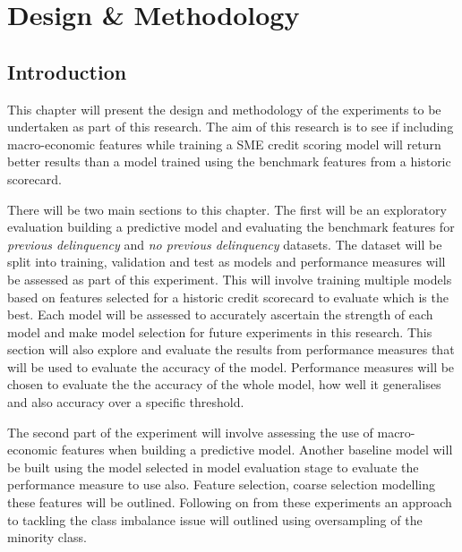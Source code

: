 
\chapter{Design \& Methodology} %

\label{Chapter4} %


\section{Introduction}

This chapter will present the design and methodology of the experiments to be undertaken as part of this research. The aim of this research is to see if including macro-economic features while training a SME credit scoring model will return better results than a model trained using the benchmark features from a historic scorecard. 

There will be two main sections to this chapter. The first will be an exploratory evaluation building a predictive model and evaluating the benchmark features for \textit{previous delinquency} and \textit{no previous delinquency} datasets. The dataset will be split into training, validation and test as models and performance measures will be assessed as part of this experiment. This will involve training multiple models based on features selected for a historic credit scorecard to evaluate which is the best. Each model will be assessed to accurately ascertain the strength of each model and make model selection for future experiments in this research. This section will also explore and evaluate the results from performance measures that will be used  to evaluate the accuracy of the model. Performance measures will be chosen to evaluate the the accuracy of the whole model, how well it generalises and also accuracy over a specific threshold. 

The second part of the experiment will involve assessing the use of macro-economic features when building a predictive model. Another baseline model will be built using the model selected in model evaluation stage to evaluate the performance measure to use also. Feature selection, coarse selection  modelling these features will be outlined. Following on from these experiments an approach to tackling the class imbalance issue will outlined using oversampling of the minority class.



